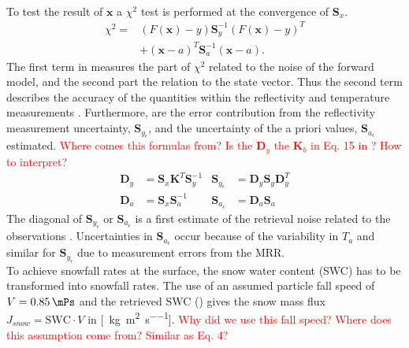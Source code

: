 \\
To test the result of $\mathbf{x}$ a $\chi^2$ test is performed at the convergence of $\mathbf{S}_x$.
%
\begin{equation}
	\begin{split}
		\chi^2 = & \left( F(\mathbf{x}) - y  \right) \mathbf{S}_y^{-1} \left( F(\mathbf{x}) - y \right)^T \\
		& + \left( \mathbf{x} - a \right)^T \mathbf{S}_a^{-1} \left( \mathbf{x} - a\right). 
	\end{split}
	\label{eq:chi}
\end{equation}
%
The first term in  measures the part of $\chi^2$ related to the noise of the forward model, and the second part the relation to the state vector. Thus the second term describes the accuracy of the quantities within the reflectivity and temperature measurements \citep{rodgers_inverse_2000}.
Furthermore, are the error contribution from the reflectivity measurement uncertainty, $\mathbf{S}_{y_\epsilon}$, and the uncertainty of the a priori values, $\mathbf{S}_{a_\epsilon}$ estimated. \textcolor{red}{Where comes this formulas from? Is the $\mathbf{D}_y$ the $\mathbf{K}_b$ in Eq. 15 in \cite{wood_characterization_2013}? How to interpret?}
%
\begin{align}
	\mathbf{D}_y  & = \mathbf{S}_x \mathbf{K}^T \mathbf{S}_y^{-1} %
	& \mathbf{S}_{y_\epsilon} & = \mathbf{D}_y \mathbf{S}_y \mathbf{D}_y^T \\
	\mathbf{D}_a & = \mathbf{S}_x \mathbf{S}_a^{-1} %
	& \mathbf{S}_{a_\epsilon} & = \mathbf{D}_a \mathbf{S}_a
\end{align}
The diagonal of $\mathbf{S}_{y_\epsilon}$ or $\mathbf{S}_{a_\epsilon}$ is a first estimate of the retrieval noise related to the observations \citep{rodgers_inverse_2000}. Uncertainties in $\mathbf{S}_{a_\epsilon}$ occur because of the variability in $T_a$ and similar for $\mathbf{S}_{y_\epsilon}$ due to measurement errors from the MRR.
\\
\newline
%
To achieve snowfall rates at the surface, the snow water content (SWC) has to be transformed into snowfall rates. The use of an assumed particle fall speed of $V = \SI{0.85}{\mPs}$ and the retrieved SWC () gives the snow mass flux $J_{snow} = \text{SWC} \cdot V$ in [\SI{}{\kilogram\per\square\metre\per\second}]. \textcolor{red}{Why did we use this fall speed? Where does this assumption come from? Similar as \cite{cooper_variational_2017} Eq. 4?} 
